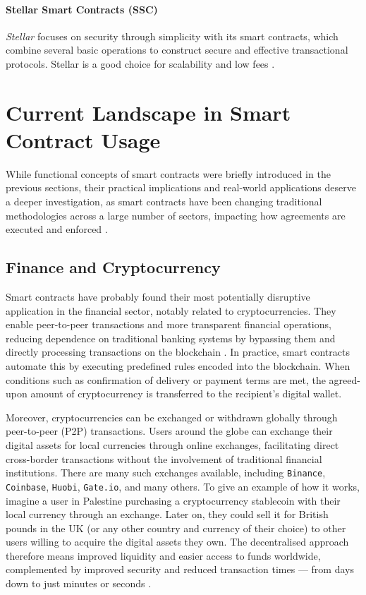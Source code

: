 \paragraph{Stellar Smart Contracts (SSC)}

\textit{Stellar} focuses on security through simplicity with its smart contracts, which combine several basic operations to construct secure and effective transactional protocols. Stellar is a good choice for scalability and low fees \cite{MokdadEtAl2022}.

\section{Current Landscape in Smart Contract Usage}

While functional concepts of smart contracts were briefly introduced in the previous sections, their practical implications and real-world applications deserve a deeper investigation, as smart contracts have been changing traditional methodologies across a large number of sectors, impacting how agreements are executed and enforced \cite{MagazzeniEtAl2017}.

\subsection{Finance and Cryptocurrency}

Smart contracts have probably found their most potentially disruptive application in the financial sector, notably related to cryptocurrencies. They enable peer-to-peer transactions and more transparent financial operations, reducing dependence on traditional banking systems \cite{AlmahirahEtAl2021, MagazzeniEtAl2017} by bypassing them and directly processing transactions on the blockchain \cite{Smith2020}. In practice, smart contracts automate this by executing predefined rules encoded into the blockchain. When conditions such as confirmation of delivery or payment terms are met, the agreed-upon amount of cryptocurrency is transferred to the recipient’s digital wallet.

Moreover, cryptocurrencies can be exchanged or withdrawn globally through peer-to-peer (P2P) transactions. Users around the globe can exchange their digital assets for local currencies through online exchanges, facilitating direct cross-border transactions without the involvement of traditional financial institutions. There are many such exchanges available, including \texttt{Binance}, \texttt{Coinbase}, \texttt{Huobi}, \texttt{Gate.io}, and many others. To give an example of how it works, imagine a user in Palestine purchasing a cryptocurrency stablecoin with their local currency through an exchange. Later on, they could sell it for British pounds in the UK (or any other country and currency of their choice) to other users willing to acquire the digital assets they own. The decentralised approach therefore means improved liquidity and easier access to funds worldwide, complemented by improved security and reduced transaction times — from days down to just minutes or seconds \cite{DelgadoSeguraEtAl2018}.

